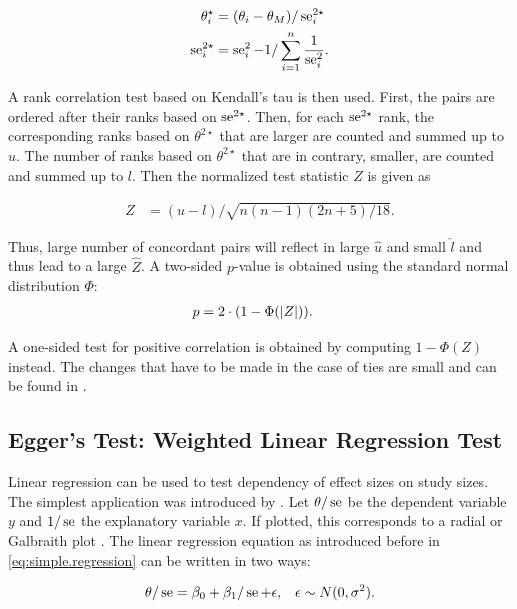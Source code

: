 \documentclass[11pt,a4paper,twoside]{book}\usepackage[]{graphicx}\usepackage[]{color}
\begin{document}
\begin{align}
\theta_i^\star &= (\theta_i - \theta_M)/\operatorname{se}_i^{2\star} \label{eq:begg.stand.eff}  \\
\operatorname{se}_i^{2\star} &= \operatorname{se}_i^2 - 1/\sum_{i = 1}^n\frac{1}{\operatorname{se}_i^2}. \label{eq:begg.stand.var} 
\end{align}

A rank correlation test based on Kendall's tau is then used. First, the pairs are ordered after their ranks based on $\operatorname{se}^{2\star}$. Then, for each $\operatorname{se}^{2\star}$ rank, the corresponding ranks based on $\theta^{2\star}$ that are larger are counted and summed up to $u$. The number of ranks based on $\theta^{2\star}$ that are in contrary, smaller, are counted and summed up to $l$. Then the normalized test statistic $Z$ is given as

\begin{align}
Z &= (u - l)/\sqrt{n(n-1)(2n + 5)/18}. \nonumber
\end{align}

Thus, large number of concordant pairs will reflect in large $\hat{u}$ and small $\hat{l}$ and thus lead to a large $\hat{Z}$. A two-sided  $p$\hspace{0.4mm}-value is obtained using the standard normal distribution $\Phi$:
\begin{align}
p &= 2\cdot(1-\Phi(\left\lvert Z\right\rvert)). \nonumber
\end{align}

A one-sided test for positive correlation is obtained by computing $1-\Phi(Z)$ instead.
The changes that have to be made in the case of ties are small and can be found in \citet{begg.ties}.


\subsection{Egger's Test: Weighted Linear Regression Test} \label{sec:Egger}
Linear regression can be used to test dependency of effect sizes on study sizes. The simplest application was introduced by \citet{Egger}.
Let $\theta/\operatorname{se}$ be the dependent variable $y$ and $1/\operatorname{se}$ the explanatory variable $x$. If plotted, this corresponds to a radial or Galbraith plot \citep{galbraith}. The linear regression equation as introduced before in \eqref{eq:simple.regression} can be written in two ways:

\begin{align}
\theta/\operatorname{se} &= \beta_0 + \beta_1/\operatorname{se} + \epsilon, & \epsilon \sim N(0, \sigma^2). \label{eq:radial.plot} 
\end{align}
\end{document}
